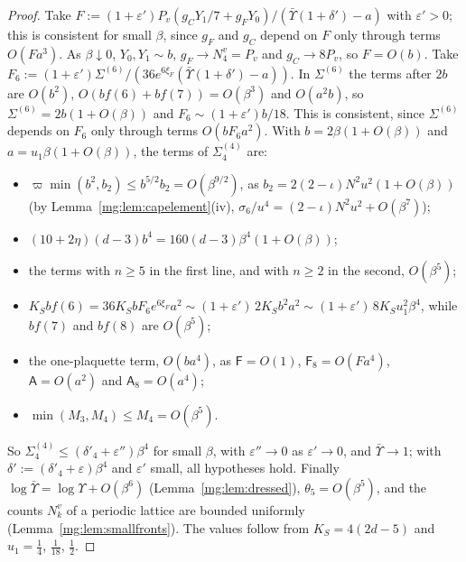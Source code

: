 \documentclass[11pt,a4paper]{article}
\theoremstyle{definition}
\theoremstyle{remark}
\begin{document}
\begin{proof}
Take $F:=(1+\varepsilon')P_v(g_CY_1/7+g_FY_0)/(\bar\Upsilon(1+\delta')-a)$ with $\varepsilon'>0$; this is consistent for small $\beta$, since $g_F$ and $g_C$ depend on $F$ only
through terms $O(Fa^3)$. As $\beta\downarrow0$, $Y_0,Y_1\sim b$, $g_F\to N^v_4=P_v$ and $g_C\to8P_v$, so $F=O(b)$. Take
$F_6:=(1+\varepsilon')\Sigma^{(6)}/(36e^{6\xi_F}(\bar\Upsilon(1+\delta')-a))$. In $\Sigma^{(6)}$ the terms after $2b$ are $O(b^2)$, $O(bf(6)+bf(7))=O(\beta^3)$ and $O(a^2b)$,
so $\Sigma^{(6)}=2b(1+O(\beta))$ and $F_6\sim(1+\varepsilon')b/18$. This is consistent, since $\Sigma^{(6)}$ depends on $F_6$ only through terms $O(bF_6a^2)$. With
$b=2\beta(1+O(\beta))$ and $a=u_1\beta(1+O(\beta))$, the terms of $\Sigma^{(4)}_4$ are:
\begin{itemize}
\item $\varpi\min(b^2,b_2)\le b^{5/2}b_2=O(\beta^{9/2})$, as $b_2=2(2-\iota)N^2u^2(1+O(\beta))$ (by Lemma~\ref{mg:lem:capelement}(iv), $\sigma_6/u^4=(2-\iota)N^2u^2+O(\beta^7)$);
\item $(10+2\eta)(d-3)b^4=160(d-3)\beta^4(1+O(\beta))$;
\item the terms with $n\ge5$ in the first line, and with $n\ge2$ in the second, $O(\beta^5)$;
\item $K_Sbf(6)=36K_SbF_6e^{6\xi_F}a^2\sim(1+\varepsilon')\,2K_Sb^2a^2\sim(1+\varepsilon')\,8K_Su_1^2\beta^4$, while $bf(7)$ and $bf(8)$ are $O(\beta^5)$;
\item the one-plaquette term, $O(ba^4)$, as $\mathsf F=O(1)$, $\mathsf F_8=O(Fa^4)$, $\mathsf A=O(a^2)$ and $\mathsf A_8=O(a^4)$;
\item $\min(M_3,M_4)\le M_4=O(\beta^5)$.
\end{itemize}
So $\Sigma^{(4)}_4\le(\delta'_4+\varepsilon'')\beta^4$ for small $\beta$, with $\varepsilon''\to0$ as $\varepsilon'\to0$, and $\bar\Upsilon\to1$; with $\delta':=(\delta'_4+\varepsilon)\beta^4$ and $\varepsilon'$ small,
all hypotheses hold. Finally $\log\bar\Upsilon=\log\Upsilon+O(\beta^6)$ (Lemma~\ref{mg:lem:dressed}), $\theta_5=O(\beta^5)$, and the counts $N^v_k$ of a periodic lattice are
bounded uniformly (Lemma~\ref{mg:lem:smallfronts}). The values follow from $K_S=4(2d-5)$ and $u_1=\frac14$, $\frac1{18}$, $\frac12$.
\end{proof}
\end{document}
